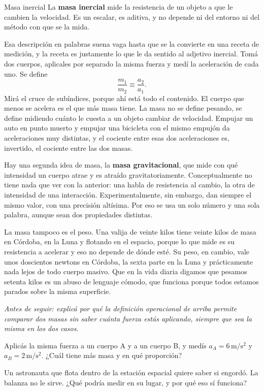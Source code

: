 \documentclass[11pt,openany]{book}
\begin{document}
\begin{bloque}{Masa inercial}
La \textbf{masa inercial} mide la resistencia de un objeto a que le cambien la velocidad. Es un escalar, es aditiva, y no depende ni del entorno ni del método con que se la mida.

Esa descripción en palabras suena vaga hasta que se la convierte en una receta de medición, y la receta es justamente lo que le da sentido al adjetivo inercial. Tomá dos cuerpos, aplicales por separado la misma fuerza y medí la aceleración de cada uno. Se define
\[
\frac{m_1}{m_2} \equiv \frac{a_2}{a_1}.
\]
Mirá el cruce de subíndices, porque ahí está todo el contenido. El cuerpo que menos se acelera es el que más masa tiene. La masa no se define pesando, se define midiendo cuánto le cuesta a un objeto cambiar de velocidad. Empujar un auto en punto muerto y empujar una bicicleta con el mismo empujón da aceleraciones muy distintas, y el cociente entre esas dos aceleraciones es, invertido, el cociente entre las dos masas.

Hay una segunda idea de masa, la \textbf{masa gravitacional}, que mide con qué intensidad un cuerpo atrae y es atraído gravitatoriamente. Conceptualmente no tiene nada que ver con la anterior: una habla de resistencia al cambio, la otra de intensidad de una interacción. Experimentalmente, sin embargo, dan siempre el mismo valor, con una precisión altísima. Por eso se usa un solo número y una sola palabra, aunque sean dos propiedades distintas.

La masa tampoco es el peso. Una valija de veinte kilos tiene veinte kilos de masa en Córdoba, en la Luna y flotando en el espacio, porque lo que mide es su resistencia a acelerar y eso no depende de dónde esté. Su peso, en cambio, vale unos doscientos newtons en Córdoba, la sexta parte en la Luna y prácticamente nada lejos de todo cuerpo masivo. Que en la vida diaria digamos que pesamos setenta kilos es un abuso de lenguaje cómodo, que funciona porque todos estamos parados sobre la misma superficie.

\textit{Antes de seguir: explicá por qué la definición operacional de arriba permite comparar dos masas sin saber cuánta fuerza estás aplicando, siempre que sea la misma en los dos casos.}
\end{bloque}

\begin{chequeo}
\item Aplicás la misma fuerza a un cuerpo A y a un cuerpo B, y medís $a_A = 6\,\mathrm{m/s^2}$ y $a_B = 2\,\mathrm{m/s^2}$. ¿Cuál tiene más masa y en qué proporción?
\item Un astronauta que flota dentro de la estación espacial quiere saber si engordó. La balanza no le sirve. ¿Qué podría medir en su lugar, y por qué eso sí funciona?
\end{chequeo}
\end{document}
